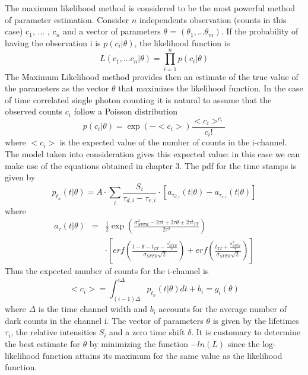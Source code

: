 The maximum likelihood method is considered to be the most powerful method of parameter estimation.
Consider $n$ independents observation (counts in this case) c$_{1}$, ... , c$_{n}$ and a vector of parameters \textbf{$\theta$} = $(\theta _{1},...\theta _{m})$. If the probability of having the observation i is $p(c_{i}|\theta)$, the likelihood function is
\begin{equation}
L(c_{1},...c_{n}|\theta) = \prod _{i = 1} ^{n} p(c_{i}|\theta) 
\end{equation}
The Maximum Likelihood method provides then an estimate of the true value of the parameters as the vector \textbf{$\theta$} that maximizes the likelihood function.
In the case of time correlated single photon counting it is natural to assume that the observed counts $c_{i}$ follow a Poisson distribution
\begin{equation}
p(c_{i}|\theta) = \exp{ \left( -<c_{i}>\right) }\frac{<c_{i}>^{c_{i}}}{c_{i}!}
\end{equation}
where $<c_{i}>$ is the expected value of the number of counts in the i-channel.
The model taken into consideration gives this expected value: in this case we can make use of the equations obtained in chapter 3. The pdf for the time stamps is given by
\begin{equation}
p_{t_{n}}(t|\theta) = A \cdot \sum _{i} \frac{S_{i}}{\tau _{d,i} - \tau _{r,i}} \cdot \left[ a_{\tau _{d, i}}(t|\theta) - a_{\tau _{r,i}}(t|\theta)\right]
\end{equation}
where 
\begin{eqnarray}
a _{\tau}(t|\theta) &=& \frac{1}{2} \exp{\left(\frac{\sigma _{SPTR} ^{2} - 2\tau t +2\tau \theta + 2\tau t_{TT}}{2\tau ^{2}}\right)} \\
&& \cdot \left[ erf\left( \frac{t-\theta -t_{TT} - \frac{\sigma ^{2}_{SPTR}}{\tau}}{\sigma _{SPTR}\sqrt{2}} \right) + erf \left( \frac{t_{TT}+\frac{\sigma ^{2} _{SPTR}}{\tau}}{\sigma _{SPTR}\sqrt{2}} \right) \right]
\end{eqnarray}
Thus the expected number of counts for the i-channel is
\begin{equation}
<c_{i}> = \int _{(i-1)\Delta} ^{i\Delta} p_{t_{n}}(t|\theta)dt + b_{i} = g _{i}(\theta)
\end{equation}
where $\Delta$ is the time channel width and $b_{i}$ accounts for the average number of dark counts in the channel i.
The vector of parameters \textbf{$\theta$} is given by the lifetimes $\tau _{i}$, the relative intensities $S_{i}$ and a zero time shift $\delta$.
It is customary to determine the best estimate for \textbf{$\theta$} by minimizing the function $-ln(L)$ since the log-likelihood function attains its maximum for the same value as the likelihood function.
